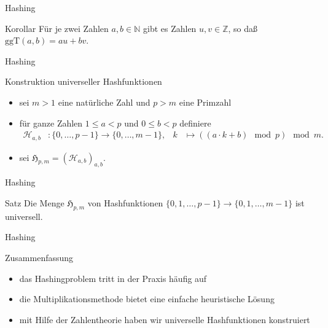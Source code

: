 \documentclass[aspectratio=1610, 11pt]{beamer}
\newcommand\cH{\mathcal H}
\newcommand\fH{\mathfrak H}
\newcommand\NN{\mathbb N}
\newcommand\ZZ{\mathbb Z}
\newcommand{\ggt}{\mathrm{ggT}}
\begin{document}
\begin{frame}{Hashing}
	\begin{block}{Korollar}
		F\"ur je zwei Zahlen $a,b\in\NN$ gibt es Zahlen $u,v\in\ZZ$, so da\ss\ $\ggt(a,b)=au+bv$.
	\end{block}
\end{frame}

\begin{frame}{Hashing}
	\begin{exampleblock}{Konstruktion universeller Hashfunktionen}
		\begin{itemize}
			\item sei $m>1$ eine nat\"urliche Zahl und $p>m$ eine Primzahl
			\item f\"ur ganze Zahlen $1\leq a<p$ und $0\leq b<p$ definiere
				\begin{align*}
					\cH_{a,b}&:\{0,\ldots,p-1\}\to\{0,\ldots,m-1\},&k&\mapsto((a\cdot k+b)\mod p)\mod m.
				\end{align*}
			\item sei $\fH_{p,m}=(\cH_{a,b})_{a,b}$.
		\end{itemize}
	\end{exampleblock}
\end{frame}

\begin{frame}{Hashing}
	\begin{block}{Satz}
		Die Menge $\fH_{p,m}$ von Hashfunktionen $\{0,1,\ldots,p-1\}\to\{0,1,\ldots,m-1\}$ ist universell.
	\end{block}
\end{frame}

\begin{frame}{Hashing}
	\begin{exampleblock}{Zusammenfassung}
		\begin{itemize}
			\item das Hashingproblem tritt in der Praxis h\"aufig auf
			\item die Multiplikationsmethode bietet eine einfache heuristische L\"osung
			\item mit Hilfe der Zahlentheorie haben wir universelle Hashfunktionen konstruiert
		\end{itemize}
	\end{exampleblock}
\end{frame}
\end{document}
